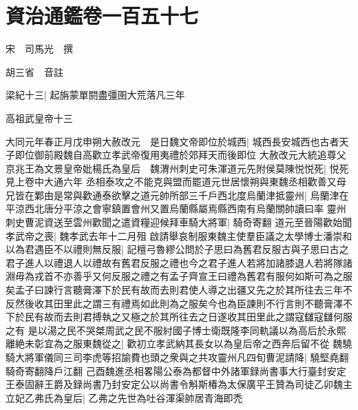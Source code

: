 \section{資治通鑑卷一百五十七}
宋　司馬光　撰

胡三省　音註

梁紀十三|{
	起旃蒙單閼盡彊圉大荒落凡三年}


高祖武皇帝十三

大同元年春正月戊申朔大赦改元　是日魏文帝即位於城西|{
	城西長安城西也古者天子即位御前殿魏自高歡立孝武帝復用夷禮於郊拜天而後即位}
大赦改元大統追尊父京兆王為文景皇帝妣楊氏為皇后　魏渭州刺史可朱渾道元先附侯莫陳悦悦死|{
	悦死見上卷中大通六年}
丞相泰攻之不能克與盟而罷道元世居懷朔與東魏丞相歡善又母兄皆在鄴由是常與歡通泰欲擊之道元帥所部三千戶西北度烏蘭津抵靈州|{
	烏蘭津在平涼西北唐分平涼之會寧鎮置會州又置烏蘭縣屬焉縣西南有烏蘭關帥讀曰率}
靈州刺史曹泥資送至雲州歡聞之遣資糧迎候拜車騎大將軍|{
	騎奇寄翻}
道元至晉陽歡始聞孝武帝之喪|{
	魏孝武去年十二月殂}
啟請舉哀制服東魏主使羣臣議之太學博士潘崇和以為君遇臣不以禮則無反服|{
	記檀弓魯繆公問於子思曰為舊君反服古與子思曰古之君子進人以禮退人以禮故有舊君反服之禮也今之君子進人若將加諸膝退人若將隊諸淵毋為戎首不亦善乎又何反服之禮之有孟子齊宣王曰禮為舊君有服何如斯可為之服矣孟子曰諫行言聽膏澤下於民有故而去則君使人導之出疆又先之於其所往去三年不反然後收其田里此之謂三有禮焉如此則為之服矣今也為臣諫則不行言則不聽膏澤不下於民有故而去則君搏執之又極之於其所往去之日遂收其田里此之謂寇讎寇讎何服之有}
是以湯之民不哭桀周武之民不服紂國子博士衛既隆李同軌議以為高后於永熙離絶未彰宜為之服東魏從之|{
	歡初立孝武納其長女以為皇后帝之西奔后留不從}
魏驍騎大將軍儀同三司李虎等招諭費也頭之衆與之共攻靈州凡四旬曹泥請降|{
	驍堅堯翻騎奇寄翻降戶江翻}
己酉魏進丞相畧陽公泰為都督中外諸軍録尚書事大行臺封安定王泰固辭王爵及録尚書乃封安定公以尚書令斛斯椿為太保廣平王贊為司徒乙卯魏主立妃乙弗氏為皇后|{
	乙弗之先世為吐谷渾渠帥居青海即禿}


